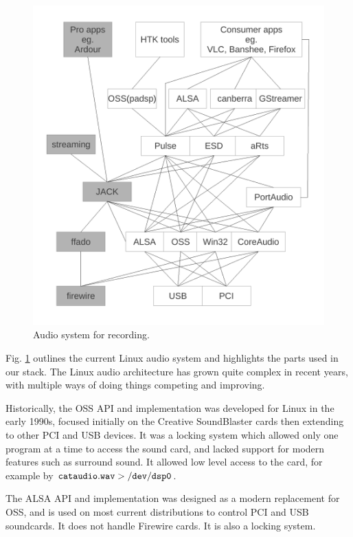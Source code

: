 \documentclass[oneside,english]{scrbook}
\begin{document}
\begin{figure}
  \centering
  \includegraphics[width=\columnwidth]{figs/linuxaudiosystem-studio.pdf}
  \caption{Audio system for recording.}
  \label{fig:audio-rec}
\end{figure}

Fig. \ref{fig:audio-rec} outlines the current Linux audio system and highlights the parts used in our stack.  The Linux audio architecture has grown quite complex in recent years, with multiple ways of doing things competing and improving.

Historically, the OSS API and implementation was developed for Linux in the early 1990s, focused initially on the Creative SoundBlaster cards then extending to other PCI and USB devices.  It was a locking system which allowed only one program at a time to access the sound card, and lacked support for modern features such as surround sound. It allowed low level access to the card, for example by $\tt cat audio.wav > /dev/dsp0$.  

The ALSA API and implementation was designed as a modern replacement for OSS, and is used on most current distributions to control PCI and USB soundcards.  It does not handle Firewire cards. It is also a locking system.
\end{document}
